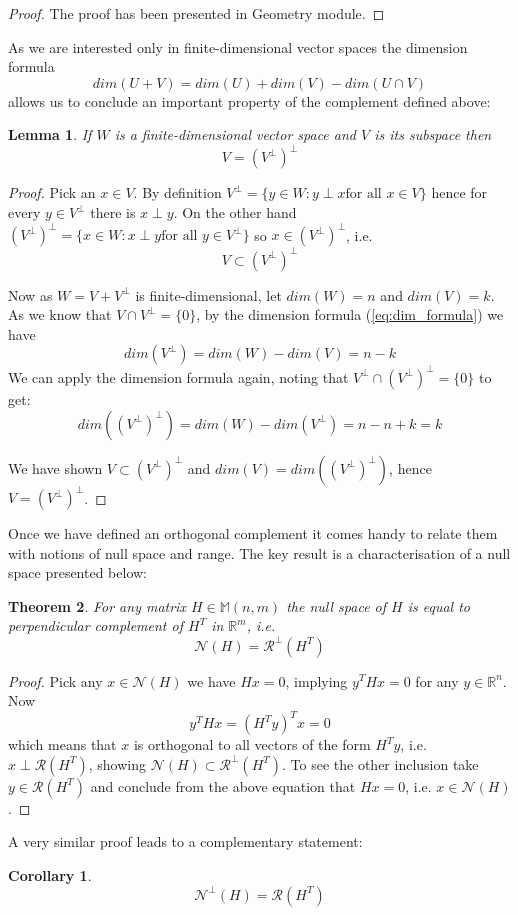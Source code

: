 \documentclass[a4paper]{article}
\theoremstyle{break}
\newtheorem{theorem}{Theorem}[section]
\newtheorem{corollary}{Corollary}[theorem]
\newtheorem{lemma}[theorem]{Lemma}
\newcommand{\R}{\mathbb{R}}
\newcommand{\Nu}{\mathcal{N}}
\newcommand{\Ra}{\mathcal{R}}
\newcommand{\Mat}[2]{\mathbb{M}(#1, #2)}
\begin{document}
\begin{proof}
    The proof has been presented in Geometry module.
\end{proof}

As we are interested only in finite-dimensional vector spaces the dimension formula
\begin{equation}\label{eq:dim_formula}
    dim(U + V) = dim(U) + dim(V) - dim( U \cap V)
\end{equation}
allows us to conclude an important property of the complement defined above:

\begin{lemma}\label{lem:double_perp}
    If $W$ is a finite-dimensional vector space and $V$ is its subspace then
    $$ V = (V^\perp)^\perp $$
\end{lemma}

\begin{proof}
    Pick an $x \in V$. By definition $ V^\perp = \{ y \in W : y \perp x \text{for all } x \in V \}$ hence for every $y \in V^\perp $ there is $x \perp y$. On the other hand $ (V^\perp)^\perp = \{ x \in W : x \perp y \text{for all } y \in V^\perp \}$ so $x \in (V^\perp)^\perp$, i.e.
    $$ V \subset (V^\perp)^\perp$$

    Now as $W = V + V^\perp$ is finite-dimensional, let $dim(W) = n$ and $dim(V) = k$. 
    As we know that $V \cap V^\perp = \{0\}$, by the dimension formula (\ref{eq:dim_formula}) we have
    $$ dim(V^\perp) = dim(W) - dim(V) = n - k $$
    We can apply the dimension formula again, noting that $ V^\perp \cap (V^\perp)^\perp = \{0\} $ to get:
    $$ dim((V^\perp)^\perp) = dim(W) - dim(V^\perp) = n - n + k = k $$

    We have shown $ V \subset (V^\perp)^\perp$ and $ dim(V) = dim((V^\perp)^\perp)$,
    hence $ V = (V^\perp)^\perp$.
\end{proof}

Once we have defined an orthogonal complement it comes handy to relate them with notions of null space and range.
The key result is a characterisation of a null space presented below:

\begin{theorem} \label{thm:charact_nullspace}
    For any matrix $H \in \Mat{n}{m}$ the null space of $H$ is equal to perpendicular complement of $H^T$ in $\R^m$, i.e.
    $$\Nu(H) = \Ra^\perp(H^T)$$
\end{theorem}

\begin{proof}
    Pick any $x \in \Nu(H)$ we have $H x = 0$, implying $ y^T H x = 0$ for any $y \in \R^n$. Now
    $$  y^T H x = (H^T y )^T x = 0$$
    which means that $x$ is orthogonal to all vectors of the form $ H^T y $, i.e. $ x \perp \Ra(H^T)$, showing $ \Nu(H) \subset \Ra^\perp(H^T)$. To see the other inclusion take $ y \in \Ra(H^T) $ and conclude from the above equation that $ H x = 0$, i.e. $ x \in \Nu(H)$.
\end{proof}
A very similar proof leads to a complementary statement:
\begin{corollary} \label{cor:charact_range}
    $$\Nu^\perp(H) = \Ra(H^T)$$
\end{corollary}
\end{document}
